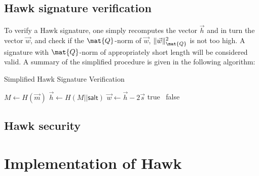 \subsection{Hawk signature verification}
To verify a Hawk signature, one simply recomputes the vector $\vec{h}$ and in turn the vector $\vec{w}$, and check if the $\mat{Q}$-norm of $\vec{w}$,
$\lVert \vec{w} \rVert_{\mat{Q}}^2$ is not too high. A signature with $\mat{Q}$-norm of appropriately short length will be considered valid.
A summary of the simplified procedure is given in the following algorithm:

\begin{algorithm}
\caption{Simplified Hawk Signature Verification}
\begin{algorithmic}[1]
    \State $M \gets H(\vec{m})$ 
    \State $\vec{h} \gets H(M || \mathsf{salt})$
    \State $\vec{w} \gets \vec{h} - 2\vec{s}$
    \State \Return true
    \Else \ \Return false
    \EndIf
\end{algorithmic}
\end{algorithm}
\subsection{Hawk security}
\section{Implementation of Hawk}
